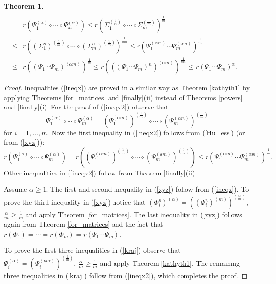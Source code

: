 \documentclass[12pt, reqno]{amsart}
\newtheorem{theorem}{Theorem}[section]
\theoremstyle{definition}
\theoremstyle{remark}
\numberwithin{equation}{section}
\newcommand{\be}{\begin{equation}}
\newcommand{\ee}{\end{equation}}
\begin{document}
\begin{theorem}
\begin{eqnarray}
\end{eqnarray}
\begin{eqnarray}
\nonumber
& & r\left(\Psi _1^{(\alpha)}\circ\cdots\circ\Psi _m^{(\alpha)}\right)\le  r\left(\Sigma _1^{(\frac{1}{m})}\circ\cdots\circ\Sigma _m^{(\frac{1}{m})}\right)^{\frac{1}{m}} \\
\nonumber
&\le &  r\left((\Sigma _1 ^n)^{(\frac{1}{m})}\circ\cdots\circ(\Sigma _m ^n)^{(\frac{1}{m})}\right)^{\frac{1}{mn}}
 \le r\left(\Psi_1^{(\alpha m)}\cdots\Psi_m^{(\alpha m)}\right)^{\frac{1}{m}} \\
&\le &  r\left((\Psi_1\cdots\Psi_m)^{(\alpha m)}\right)^{\frac{1}{m}}\le  r\left(((\Psi_1\cdots\Psi_m)^n)^{(\alpha m)}\right)^{\frac{1}{nm}} \le r\left(\Psi_1\cdots\Psi_m\right)^{\alpha}. \;\;\;\;\;\;
\label{kraj}
\end{eqnarray}
\end{theorem}
\begin{proof}
Inequalities (\ref{ineqx}) are proved in a similar way as Theorem \ref{kathyth1} by applying  Theorems \ref{for_matrices} and \ref{finally}(ii)  instead of Theorems \ref{powers} and \ref{finally}(i). For the proof of (\ref{ineqx2}) observe that 
$$\Psi_1^{(\alpha)}\circ\cdots\circ\Psi_m^{(\alpha)}=(\Psi_1^{(\alpha m)})^{(\frac{1}{m})}\circ\cdots\circ(\Psi_m^{(\alpha m)})^{(\frac{1}{m})}$$
 for $i=1,\ldots , m$. Now the first inequality in (\ref{ineqx2}) follows from  (\ref{Hu_ess})
 (or from (\ref{xyz})): %
\be
\nonumber
r\left(\Psi_1^{(\alpha)}\circ\cdots\circ\Psi_m^{(\alpha)}\right)=r\left((\Psi_1^{(\alpha m)})^{(\frac{1}{m})}\circ\cdots\circ(\Psi_m^{(\alpha m)})^{(\frac{1}{m})}\right)\le r\left(\Psi_1^{(\alpha m)}\cdots\Psi_m^{(\alpha m)}\right)^{\frac{1}{m}}.
\ee
Other inequalities in  (\ref{ineqx2}) follow from Theorem \ref{finally}(ii).

Assume $\alpha \ge 1$. The first and second inequality in (\ref{xyz}) follow from (\ref{ineqx}).  To prove the third inequality in (\ref{xyz}) notice that $(\Phi_i ^n)^{(\alpha)}=((\Phi_i ^n)^{(m)})^{(\frac{\alpha}{m})}$, $\frac{\alpha}{m} \ge \frac{1}{m}$ and apply %
Theorem \ref{for_matrices}. The last inequality in (\ref{xyz}) follows again from Theorem \ref{for_matrices} and the fact that $r(\Phi_1)= \cdots = r(\Phi_m)=r(\Psi_1\cdots\Psi_m)$.

To prove the first three inequalities in (\ref{kraj}) observe that  $\Psi_i^{(\alpha)}=(\Psi_i^{(m \alpha)})^{(\frac{1}{m})}$, $\frac{\alpha}{m} \ge \frac{1}{m}$ and apply Theorem \ref{kathyth1}. The remaining three inequalities in  (\ref{kraj}) follow from (\ref{ineqx2}), which completes the proof.
\end{proof}
\end{document}
